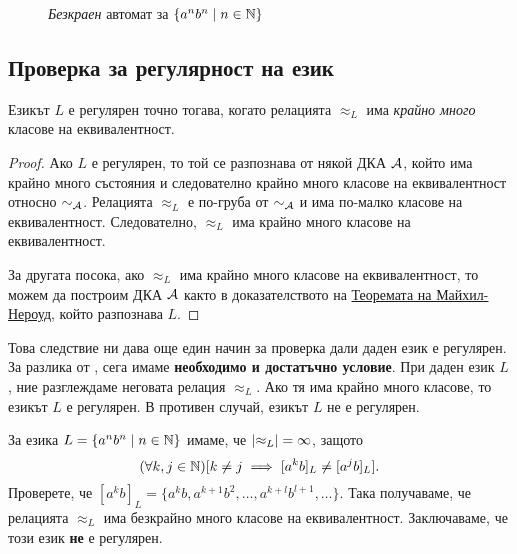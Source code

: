 \begin{example}
\begin{framed}
\begin{figure}[H]
    \caption{{\em Безкраен} автомат за $\{a^nb^n \mid n \in \mathbb{N}\}$}
  \end{figure}
\end{framed}
\end{example}

\subsection{Проверка за регулярност на език}

  \begin{prop}
    Езикът $L$ е регулярен точно тогава, когато релацията $\approx_L$ има {\em крайно много} класове на еквивалентност.
  \end{prop}
\begin{proof}
  Ако $L$ е регулярен, то той се разпознава от някой ДКА $\mathcal{A}$, който има крайно много състояния 
  и следователно крайно много класове на еквивалентност относно $\sim_{\mathcal{A}}$.
  Релацията $\approx_L$ е по-груба от $\sim_{\mathcal{A}}$ и има по-малко класове на еквивалентност.
  Следователно, $\approx_L$ има крайно много класове на еквивалентност.
  
  За другата посока, ако $\approx_L$ има крайно много класове на еквивалентност, то можем да 
  построим ДКА $\mathcal{A}$ както в доказателството на \hyperref[th:myhill-nerode]{Теоремата на Майхил-Нероуд}, който разпознава $L$.
\end{proof}

Това следствие ни дава още един начин за проверка дали даден език е регулярен.
За разлика от , сега имаме {\bf необходимо и достатъчно условие}.
При даден език $L$, ние разглеждаме неговата релация $\approx_L$.
Ако тя има крайно много класове, то езикът $L$ е регулярен.
В противен случай, езикът $L$ не е регулярен.

\begin{example}
  За езика $L = \{a^nb^n\mid n \in \mathbb{N}\}$ имаме, че $\lvert{\approx_L}\rvert = \infty$,
  защото \[(\forall k,j\in\mathbb{N})[k \neq j \implies [a^kb]_L \neq [a^jb]_L].\]
  Проверете, че $[a^kb]_L = \{a^kb,a^{k+1}b^{2},\dots,a^{k+l}b^{l+1},\dots\}$.
  Така получаваме, че релацията $\approx_L$ има безкрайно много класове на еквивалентност.
  Заключаваме, че този език {\bf не} е регулярен.
\end{example}

